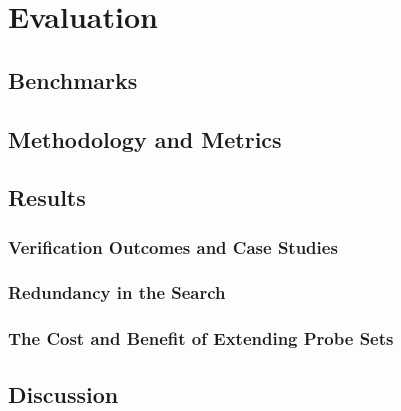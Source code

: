 \setlength{\parindent}{0pt}
\chapter{Evaluation}
\section{Benchmarks}
\section{Methodology and Metrics}
\section{Results}
  \subsection{Verification Outcomes and Case Studies} %
  \subsection{Redundancy in the Search} %
  \subsection{The Cost and Benefit of Extending Probe Sets}
\section{Discussion}
